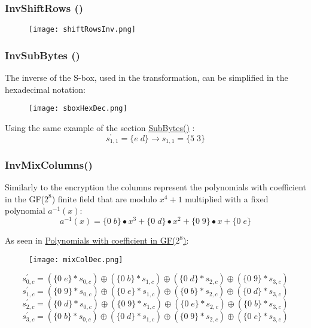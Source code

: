 \documentclass{article}
\begin{document}
\subsubsection{InvShiftRows ()}
\begin{figure}[htb]
	\begin{center}
  		\texttt{[image: shiftRowsInv.png]} 
 	\end{center}
\end{figure}

\subsubsection{InvSubBytes ()}
The inverse of the S-box, used in the transformation, can be simplified in the hexadecimal notation:
\begin{figure}[htb]
	\begin{center}
  		\texttt{[image: sboxHexDec.png]} 
 	\end{center}
\end{figure}
Using the same example of the section \hyperref[sec:sboxEnc]{SubBytes()} :
\[s^{’}_{1,1}=\{e\;d\} \longrightarrow s_{1,1}=\{5\; 3\}\]

\subsubsection{InvMixColumns()}
Similarly to the encryption the columns represent the polynomials with coefficient in the GF($2^8$) finite field that are modulo $x^4+1$ multiplied  with a fixed polynomial $a^{-1}(x)$:
\[a^{-1}(x) = \{0\;b\}•x^3 + \{0\;d\}•x^2+ \{0\;9\}•x + \{0\;e\}\]

As seen in \hyperref[sec:polyGF]{Polynomials with coefficient in GF($2^8$)}:
\begin{figure}[htb]
	\begin{center}
  		\texttt{[image: mixColDec.png]} 
 	\end{center}
\end{figure}

\[s^{'}_{0,c}= (\{0\;e\} * s_{0,c}) \oplus (\{0\;b\} * s_{1,c}) \oplus (\{0\;d\} * s_{2,c})\oplus  (\{0\;9\} * s_{3,c})\]
\[s^{'}_{1,c}= (\{0\;9\} * s_{0,c}) \oplus  (\{0\;e\} * s_{1,c})\oplus (\{0\;b\} * s_{2,c}) \oplus (\{0\;d\} * s_{3,c})\]
\[s^{'}_{2,c}= (\{0\;d\} * s_{0,c}) \oplus (\{0\;9\} * s_{1,c}) \oplus (\{0\;e\} * s_{2,c}) \oplus (\{0\;b\} * s_{3,c})\]
\[s^{'}_{3,c}= (\{0\;b\} * s_{0,c}) \oplus (\{0\;d\} * s_{1,c}) \oplus (\{0\;9\} * s_{2,c}) \oplus (\{0\;e\} * s_{3,c})\]
\end{document}
